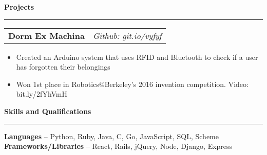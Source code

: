 \documentclass[11pt,letterpaper]{article}
\makeatletter
\newenvironment{topic}[1]
    {
    {\Large \centerline{#1}}
    \vspace*{0.03in}
    \hrule 
    \vspace*{0.05in}
    }
    {}
\newenvironment{event}
    {
    \begin{tabular*}{\textwidth}{l@{\extracolsep{\fill}}r}
    }
    {
    \end{tabular*}
    }
\newenvironment{detail}
    {
    \normalsize
    }
    {
    \vspace*{0.02in}
    }
\makeatother
\begin{document}
\begin{topic}{\textbf{Projects}}
        \begin{event}
            \textbf{Dorm Ex Machina} & \emph{Github: git.io/vyfyf}
        \end{event}
            \begin{itemize}
                \item Created an Arduino system that uses RFID and Bluetooth to check if a user has forgotten their belongings
                \item Won 1st place in Robotics@Berkeley's 2016 invention competition. Video: bit.ly/2fYhVmH
            \end{itemize}
        
    \end{topic} \vspace*{0.1in}










    \begin{topic}{\textbf{Skills and Qualifications}}
        \begin{detail}
            \textbf{Languages} -- Python, Ruby, Java, C, Go, JavaScript, SQL, Scheme \\
            \textbf{Frameworks/Libraries} -- React, Rails, jQuery, Node, Django, Express 
        \end{detail}
    \end{topic}
\end{document}
